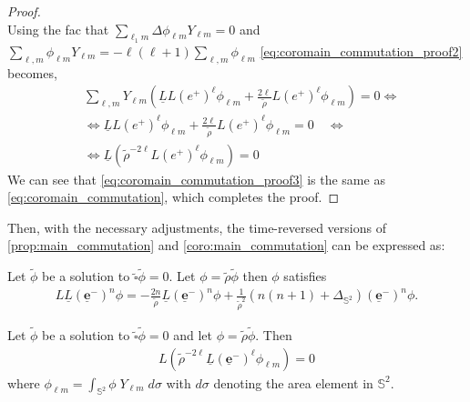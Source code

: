 \begin{proof}
\begin{equation}
  \end{equation}
  Using the fac that $\sum_{\ell_{1} m} \Delta \phi_{\ell m} Y_{\ell m}=0$ and $\sum_{\ell, m} \phi_{\ell m} Y_{\ell m}=-\ell(\ell+1) \sum_{\ell, m} \phi_{\ell m}$ \eqref{eq:coromain_commutation_proof2} becomes,
  \begin{align}\label{eq:coromain_commutation_proof3}
    & \sum_{\ell, m} Y_{\ell m}\left(\underline{L} L\left(e^{+}\right)^{\ell} \phi_{\ell m}+\frac{2 \ell}{\tilde{\rho}} L\left(e^{+}\right)^{\ell} \phi_{\ell m}\right)=0 \Leftrightarrow \nonumber \\
    & \Leftrightarrow \underline{L} L\left(e^{+}\right)^{\ell} \phi_{\ell m}+\frac{2 \ell}{\tilde{\rho}} L\left(e^{+}\right)^{\ell} \phi_{\ell m}=0 \quad \Leftrightarrow \nonumber \\
    & \Leftrightarrow \underline{L}\left(\tilde{\rho}^{-2 \ell} L\left(e^{+}\right)^{\ell} \phi_{\ell m}\right)=0
  \end{align}
  We can see that \eqref{eq:coromain_commutation_proof3} is the same as \eqref{eq:coromain_commutation}, which completes the proof.   
\end{proof}
\vspace{-0.2cm}
Then, with the necessary adjustments, the time-reversed versions of \ref{prop:main_commutation} and \ref{coro:main_commutation} can be expressed as:
\begin{proposition}\label{prop:main_commutation_minus}
  Let $\tilde{\phi}$ be a solution to
  $\tilde{\square}\tilde{\phi}=0$.  Let $\phi =
  \tilde{\rho}\tilde{\phi}$ then $\phi$ satisfies
 \begin{align}\label{eq:main_commutation_minus}
   L \underline{L} (\boldsymbol{\underline{e}}^{-})^n \phi = -\frac{2n}{\tilde{\rho}}\underline{L}
   (\boldsymbol{\underline{e}}^{-})^n \phi + \frac{1}{\tilde{\rho}^2}(n(n+1) +
   \Delta_{\mathbb{S}^2})(\boldsymbol{\underline{e}}^{-})^n \phi.
 \end{align}
\end{proposition}
\begin{corollary}\label{coro:main_commutation_minus}
  Let $\tilde{\phi}$ be a solution to
  $\tilde{\square}\tilde{\phi}=0$ and let $\phi =
  \tilde{\rho}\tilde{\phi}$. Then
  \begin{align}\label{eq:coromain_commutation_minus}
  L (\tilde{\rho}^{-2\ell} \underline{L} (\boldsymbol{\underline{e}}^{-})^{\ell}\phi_{\ell m}) = 0
  \end{align}
  where $\phi_{\ell m}= \int_{\mathbb{S}^2} \phi \; Y_{\ell m} \;
  d\sigma$ with $d\sigma$ denoting the area element in $\mathbb{S}^2$.
\end{corollary}
